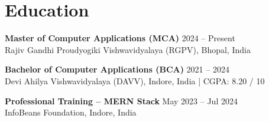 \documentclass[a4paper,10pt]{article}
\begin{document}
\section{Education}

\textbf{Master of Computer Applications (MCA)} \hfill 2024 -- Present \\
Rajiv Gandhi Proudyogiki Vishwavidyalaya (RGPV), Bhopal, India

\vspace{2pt}

\textbf{Bachelor of Computer Applications (BCA)} \hfill 2021 -- 2024 \\
Devi Ahilya Vishwavidyalaya (DAVV), Indore, India | CGPA: 8.20 / 10

\vspace{2pt}

\textbf{Professional Training -- MERN Stack} \hfill May 2023 -- Jul 2024 \\
InfoBeans Foundation, Indore, India
\end{document}
